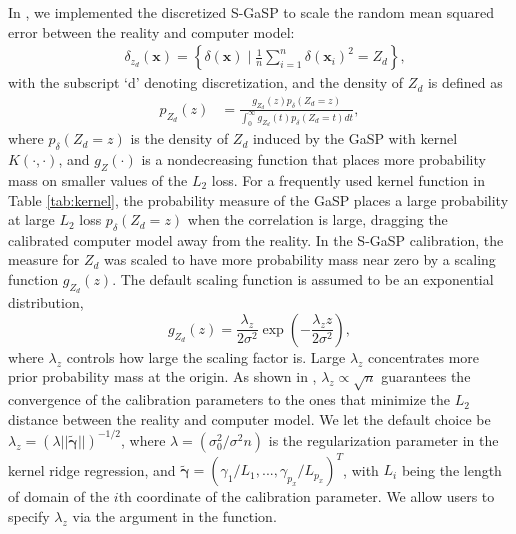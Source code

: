 In , we implemented the discretized  S-GaSP  to scale the random mean squared error between the reality and computer model: 
\begin{align}
&\delta_{z_d}(\mathbf x) = \left\{ \delta(\mathbf x) \mid \frac{1}{n}{\sum^{n}_{i=1} \delta( \mathbf x_{i} )^2} =Z_d\right\}, 
\label{equ:delta_z_d}
\end{align}
with the subscript `d' denoting discretization, and the density of $Z_d$ is defined as   
\begin{align}
p_{Z_d}(z) &=	\frac{g_{Z_d}\left(z  \right) p_{ \delta}\left(Z_d=z  \right)}{\int_0^\infty g_{Z_d}\left( t \right)  p_{ \delta}\left(Z_d = t \right)d t },
\label{equ:p_Z_d}
\end{align}
where $p_{ \delta}(Z_d = z)$ is the density of $Z_d$ induced by the GaSP with kernel $K(\cdot,\cdot)$, and $g_Z(\cdot)$ is a nondecreasing function that places more probability mass on smaller values of the $L_2$ loss.   For a frequently used kernel function in Table \ref{tab:kernel}, the probability measure  of the GaSP places a large probability at large $L_2$ loss $p_{ \delta}\left(Z_d=z  \right)$  when the correlation is large, dragging the calibrated computer model away from the reality. In the S-GaSP calibration, the measure for $Z_d$ was scaled to have more probability mass near zero by a scaling function $g_{Z_d}(z)$. The default scaling function is assumed to be an exponential distribution,
\begin{equation}
 g_{Z_d}(z) = \frac{\lambda_z }{2\sigma^2 } \exp\left(-\frac {\lambda_z z}{2\sigma^2 }\right),
 \label{equ:g_Z_d}
 \end{equation}
where $\lambda_z$ controls how large the scaling factor is. Large $\lambda_z$ concentrates more prior probability mass at the origin. As shown in \cite{gu2022theoretical}, $\lambda_z \propto \sqrt{n}$ guarantees the convergence of the calibration parameters to the ones that minimize the $L_2$ distance between the reality and computer model. 
We let  the default choice be $\lambda_z=(\lambda || \bm {\tilde \gamma}||)^{-1/2}$, where $\lambda=(\sigma^2_0/\sigma^2n)$ is the regularization parameter in the kernel ridge regression, and $\tilde {\bm \gamma}=(\gamma_1/L_1,...,\gamma_{p_x}/L_{p_x})^T$,  with $L_i$ being the length of domain of the $i$th coordinate of the calibration parameter. We allow users to specify $\lambda_z$ via the argument   in the  function. 

